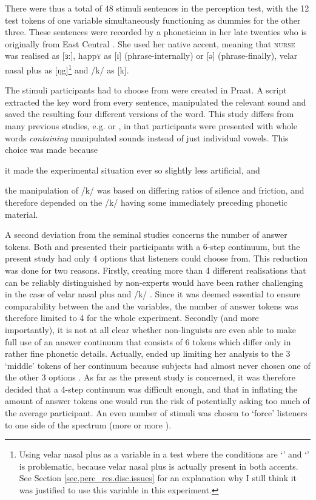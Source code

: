 There were thus a total of 48 stimuli sentences in the perception test, with the 12 test tokens of one variable simultaneously functioning as dummies for the other three.
These sentences were recorded by a phonetician in her late twenties who is originally from East Central .
She used her native  accent, meaning that \textsc{nurse} was realised as [ɜ:], happ\textsc{y} as [ɪ] (phrase-internally) or [ə] (phrase-finally), velar nasal plus as [ŋg]\footnote{Using velar nasal plus as a variable in a  test where the conditions are `' and `' is problematic, because velar nasal plus is actually present in both accents. See Section \ref{sec.perc_res.disc.issues} for an explanation why I still think it was justified to use this variable in this  experiment.} and /k/ as [k].

The stimuli participants had to choose from were created in Praat.
A script extracted the key word from every sentence, manipulated the relevant sound and saved the resulting four different versions of the word.
This study differs from many previous studies, e.g. \textcite{hayetal2006a} or \textcite{niedzielski1999}, in that participants were presented with whole words \emph{containing} manipulated sounds instead of just individual vowels.
This choice was made because
\begin{inparaenum}[(a)]
	\item it made the experimental situation ever so slightly less artificial, and
	\item the manipulation of /k/ was based on differing ratios of silence and friction, and therefore depended on the /k/ having some immediately preceding phonetic material.
\end{inparaenum}
A second deviation from the seminal studies concerns the number of answer tokens.
Both \citeauthor{niedzielski1999} and \citeauthor{hayetal2006a} presented their participants with a 6-step continuum, but the present study had only 4 options that listeners could choose from.
This reduction was done for two reasons.
Firstly, creating more than 4 different realisations that can be reliably distinguished by non-experts would have been rather challenging in the case of velar nasal plus and /k/ .
Since it was deemed essential to ensure comparability between the  and the  variables, the number of answer tokens was therefore limited to 4 for the whole experiment.
Secondly (and more importantly), it is not at all clear whether non-linguists are even able to make full use of an answer continuum that consists of 6 tokens which differ only in rather fine phonetic details.
Actually, \citealt{niedzielski1999} ended up limiting her analysis to the 3 `middle' tokens of her continuum because subjects had almost never chosen one of the other 3 options \parencite[cf.][64--65]{niedzielski1999}.
As far as the present study is concerned, it was therefore decided that a 4-step continuum was difficult enough, and that in inflating the amount of answer tokens one would run the risk of potentially asking too much of the average participant.
An even number of stimuli was chosen to `force' listeners to one side of the spectrum (more  or more ).

